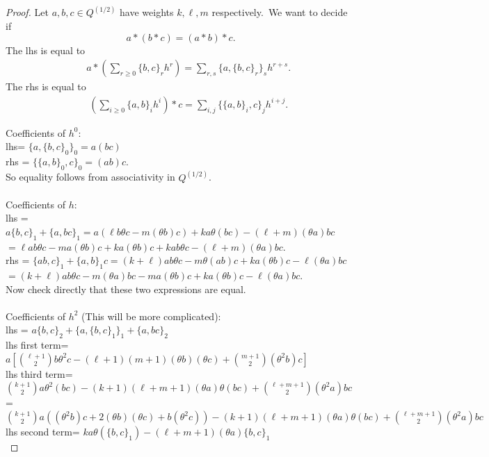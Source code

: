 \documentclass[12pt]{amsart}
\theoremstyle{plain}
\theoremstyle{definition}
\theoremstyle{remark}
\begin{document}
\iffalse
\begin{proof}
Let $a, b, c\in Q^{(1/2)}$ have weights $k, \ell, m$ respectively.\ We want to decide if
$$a*(b*c)= (a*b)*c.$$
The lhs is equal to
\begin{eqnarray*}
&& a*\left(\sum_{r\geq0} \{b, c\}_rh^r\right)=\sum_{r, s} \{a, \{b, c\}_r\}_s h^{r+s}.
\end{eqnarray*}
The rhs is equal to
\begin{eqnarray*}
  && \left(\sum_{i\geq0} \{a, b\}_ih^i   \right)*c  =\sum_{i, j} \{\{a, b\}_i, c\}_j h^{i+j}.
\end{eqnarray*}

\medskip\noindent
Coefficients of $h^0$:\\
lhs= $\{a, \{b, c\}_0\}_0=a(bc)$\\
rhs = $\{\{a, b\}_0, c\}_0 = (ab)c.$\\
So equality follows from associativity in $Q^{(1/2)}$.\\
\\
Coefficients of $h$:\\
lhs = $a\{b, c\}_1 +\{a, bc\}_1=a(\ell b\theta c -m(\theta b)c)+ka\theta(bc)-
(\ell+m)(\theta a)bc$\\
$=\ell ab\theta c-ma(\theta b)c+ka(\theta b)c+kab\theta c-
(\ell+m)(\theta a)bc.$\\
rhs = $\{ab, c\}_1+\{a, b\}_1c =
(k+\ell)ab\theta c -m\theta(ab)c+ka(\theta b)c-\ell(\theta a)bc$\\
$=
(k+\ell)ab\theta c -m(\theta a)bc -ma(\theta b)c+ka(\theta b)c-\ell(\theta a)bc.$\\
Now check directly that these two expressions are equal.\\
\\
Coefficients of $h^2$ (This will be more complicated):\\
lhs = $a\{b, c\}_2+\{a, \{b, c\}_1\}_1
+\{a, bc\}_2$\\
lhs first term= $a\left[{\ell+1\choose 2}b\theta^2c-(\ell+1)(m+1)(\theta b)(\theta c)+{m+1\choose 2}(\theta^2 b)c  \right] $\\
lhs third term=\\
${k+1\choose 2}a\theta^2(bc)-(k+1)(\ell+m+1)(\theta a) \theta(bc)
+{\ell+m+1\choose 2}(\theta^2 a)bc$\\
=${k+1\choose 2}a((\theta^2b)c +2(\theta b)(\theta c) +b(\theta^2 c)) -(k+1)(\ell+m+1)(\theta a) \theta(bc)
+{\ell+m+1\choose 2}(\theta^2 a)bc$\\
lhs second term= $ka\theta(\{b, c\}_1)-(\ell+m+1)(\theta a)\{b, c\}_1$\\

\end{proof}
\end{document}
